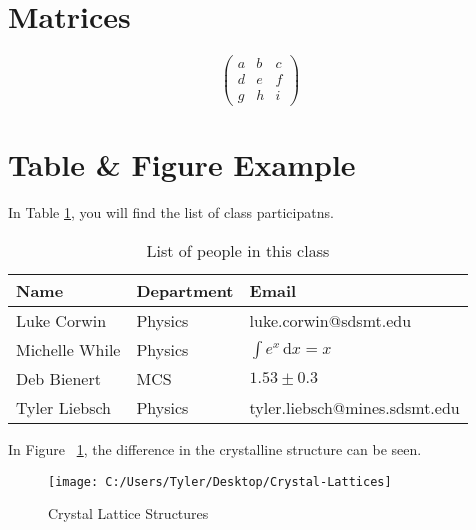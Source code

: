 \documentclass[12pt]{article}
\begin{document}
\section{Matrices}
$$ \begin{pmatrix}
a & b & c \\
d & e & f \\
g & h & i 
\end{pmatrix} $$

\section{Table \& Figure Example}

In Table \ref{tab:classlist}, you will find the list of class participatns.

\begin{table}[htb]
\begin{center}
\begin{tabular}{|l|l|l|}
\hline
Name & Department & Email \\ 
\hline \hline
Luke Corwin & Physics & luke.corwin@sdsmt.edu\\
Michelle While & Physics & $ \int e^x \, \text{d}x =x$ \\
Deb Bienert & MCS & $1.53 \pm 0.3 $\\
Tyler Liebsch & Physics & tyler.liebsch@mines.sdsmt.edu\\
\hline
\end{tabular}
\caption{List of people in this class}
\label{tab:classlist}
\end{center}
\end{table}

\newpage
In Figure ~\ref{fig:lattice}, the difference in the crystalline structure can be seen.

\begin{figure}
\caption{Crystal Lattice Structures}
\texttt{[image: C:/Users/Tyler/Desktop/Crystal-Lattices]}
\label{fig:lattice}
\end{figure}
\end{document}
